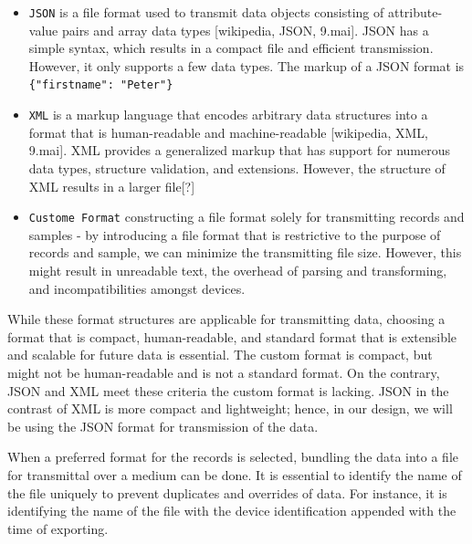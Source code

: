 \begin{itemize}
    \item \verb|JSON| is a file format used to transmit data objects consisting of attribute-value pairs and array data types [wikipedia, JSON, 9.mai]. JSON has a simple syntax, which results in a compact file and efficient transmission. However, it only supports a few data types. The markup of a JSON format is \verb|{"firstname": "Peter"}|
    \item \verb|XML| is a markup language that encodes arbitrary data structures into a format that is human-readable and machine-readable [wikipedia, XML, 9.mai]. XML provides a generalized markup that has support for numerous data types, structure validation, and extensions. However, the structure of XML results in a larger file[?]
    \item \verb|Custome Format| constructing a file format solely for transmitting records and samples - by introducing a file format that is restrictive to the purpose of records and sample, we can minimize the transmitting file size. However, this might result in unreadable text, the overhead of parsing and transforming, and incompatibilities amongst devices. 
\end{itemize}
While these format structures are applicable for transmitting data, choosing a format that is compact, human-readable, and standard format that is extensible and scalable for future data is essential. The custom format is compact, but might not be human-readable and is not a standard format. On the contrary,  JSON and XML meet these criteria the custom format is lacking. JSON in the contrast of XML is more compact and lightweight; hence, in our design, we will be using the JSON format for transmission of the data.

When a preferred format for the records is selected, bundling the data into a file for transmittal over a medium can be done. It is essential to identify the name of the file uniquely to prevent duplicates and overrides of data. For instance, it is identifying the name of the file with the device identification appended with the time of exporting. 

